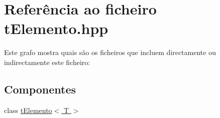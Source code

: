 \hypertarget{a00021}{\section{Referência ao ficheiro t\+Elemento.\+hpp}
\label{a00021}
}
Este grafo mostra quais são os ficheiros que incluem directamente ou indirectamente este ficheiro\+:
\subsection*{Componentes}
\begin{DoxyCompactItemize}
\item 
class \hyperlink{a00006}{t\+Elemento$<$ T $>$}
\end{DoxyCompactItemize}

